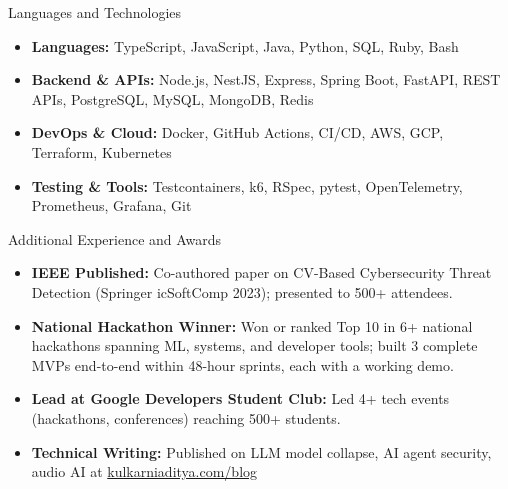 \documentclass[]{mcdowellcv}
\begin{document}
\begin{cvsection}{Languages and Technologies}
  \begin{cvsubsection}{}{}{}
    \begin{itemize}
      \item \textbf{Languages:} TypeScript, JavaScript, Java, Python, SQL, Ruby, Bash
      \item \textbf{Backend \& APIs:} Node.js, NestJS, Express, Spring Boot, FastAPI, REST APIs, PostgreSQL, MySQL, MongoDB, Redis
      \item \textbf{DevOps \& Cloud:} Docker, GitHub Actions, CI/CD, AWS, GCP, Terraform, Kubernetes
      \item \textbf{Testing \& Tools:} Testcontainers, k6, RSpec, pytest, OpenTelemetry, Prometheus, Grafana, Git
    \end{itemize}
  \end{cvsubsection}
\end{cvsection}

\begin{cvsection}{Additional Experience and Awards}
  \begin{cvsubsection}{}{}{}
    \begin{itemize}
      \item \textbf{IEEE Published:} Co-authored paper on CV-Based Cybersecurity Threat Detection (Springer icSoftComp 2023); presented to 500+ attendees.
      \item \textbf{National Hackathon Winner:} Won or ranked Top 10 in 6+ national hackathons spanning ML, systems, and developer tools; built 3 complete MVPs end-to-end within 48-hour sprints, each with a working demo.
      \item \textbf{Lead at Google Developers Student Club:} Led 4+ tech events (hackathons, conferences) reaching 500+ students.
      \item \textbf{Technical Writing:} Published on LLM model collapse, AI agent security, audio AI at \href{https://www.kulkarniaditya.com/blog}{kulkarniaditya.com/blog}
    \end{itemize}
  \end{cvsubsection}
\end{cvsection}
\end{document}
